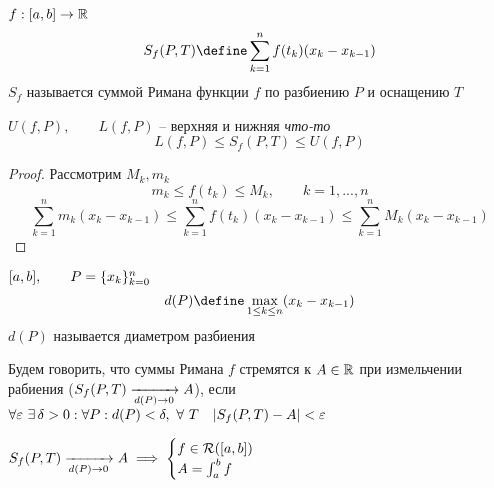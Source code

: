 \begin{definition}
	$ f : [a, b] \to \R $
	$$ S_f(P, T) \define \sum_{k = 1}^n f(t_k)(x_k - x_{k - 1}) $$
	$ S_f $ называется суммой Римана функции $ f $ по разбиению $ P $ и оснащению $ T $
\end{definition}

\begin{statement}
	$ U(f, P), \qquad L(f, P) $ -- верхняя и нижняя \textit{что-то}
	$$ L(f, P) \le S_f(P, T) \le U(f, P) $$
\end{statement}

\begin{proof}
	Рассмотрим $ M_k, m_k $
	$$ m_k \le f(t_k) \le M_k, \qquad k = 1, ..., n $$
	$$ \sum_{k = 1}^n m_k (x_k - x_{k - 1}) \le \sum_{k = 1}^n f(t_k)(x_k - x_{k - 1}) \le \sum_{k = 1}^n M_k(x_k - x_{k - 1}) $$
\end{proof}

\begin{definition}
	$ [a, b], \qquad P = \seqz[n]{x_k}k $
	$$ d(P) \define \max\limits_{1 \le k \le n} (x_k - x_{k - 1}) $$
	$ d(P) $ называется диаметром разбиения
\end{definition}

\begin{definition}
	Будем говорить, что суммы Римана $ f $ стремятся к $ A \in \R $ при измельчении рабиения ($ S_f(P, T) \underarr{d(P) \to 0} A $), если $ \forall \veps ~ \exist \delta > 0 : \forall P : d(P) < \delta, ~ \forall ~ T \quad | S_f(P, T) - A | < \veps $
\end{definition}

\begin{theorem}
	$ S_f(P, T) \underarr{d(P) \to 0} A \implies
	\begin{cases}
		f \in \Ri([a, b]) \\
		A = \int_a^bf
	\end{cases} $
\end{theorem}

